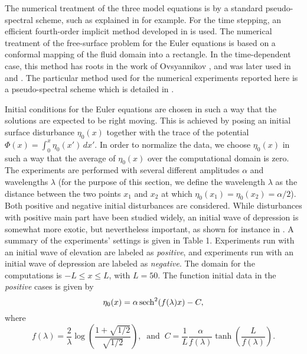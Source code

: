 The numerical treatment of the three model equations is 
by a standard pseudo-spectral scheme,
such as explained in \cite{Ehrnstrom2013,Fornberg1978} for example. For the time stepping,
an efficient fourth-order implicit method developed in \cite{DeFrutos1992} is used. 
The numerical treatment of the free-surface problem for the Euler equations
is based on a conformal mapping of the fluid domain into a rectangle.
In the time-dependent case, this method has roots in the work of Ovsyannikov \cite{Ovsyannikov1974}, 
and was later used in \cite{Dyachenko1996} and \cite{Li2004}. 
The particular method used for the numerical experiments reported here 
is a pseudo-spectral scheme which is detailed in \cite{Mitsotakis2014}.

Initial conditions for the Euler equations are chosen in such a way that 
the solutions are expected to be right moving. This is achieved by
posing an initial surface disturbance $\eta_0(x)$ together with the
trace of the potential $\Phi(x) = \int_0^x \eta_0(x')\, dx'.$
In order to normalize the data, we choose $\eta_0(x)$ in such a way that
the average of $\eta_0(x)$ over the computational domain is zero.
The experiments are performed %
with several different amplitudes $\alpha$ and wavelengths $\lambda$
(for the purpose of this section, we define the 
wavelength $\lambda$ as the distance between 
the two points $x_1$ and $x_2$ at which $\eta_0(x_1) = \eta_0(x_2) = \alpha/2$).
Both positive and negative initial disturbances are considered.
While disturbances with positive main part have been studied widely, 
an initial wave of depression is somewhat more exotic, but nevertheless important,
as shown for instance in \cite{Hammack1974}.
A summary of the experiments' settings is given in Table 1.
Experiments run with an initial wave of elevation are
labeled as {\it positive},
and experiments run with an initial wave of depression are
labeled as {\it negative}.
The domain for the computations is $-L\leq x \leq L$, with $L = 50$. 
The function initial data in the {\it positive} cases is given by
\begin{equation}
\eta_0(x) =  \alpha \operatorname{sech}^2(f(\lambda)x)-C, \label{test_1}
\end{equation}
where 
\begin{equation*}
f(\lambda) = \frac{2}{\lambda}\log\left({\textstyle \frac{1+\sqrt{1/2}}{\sqrt{1/2}}}\right), 
\ \mbox{ and } \
C = \frac{1}{L}\frac{\alpha}{f(\lambda)}\tanh \left({\textstyle \frac{L}{f(\lambda)}}\right).
\end{equation*}
